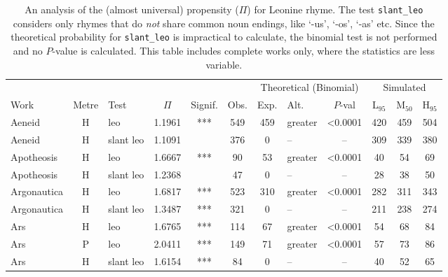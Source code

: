 \documentclass[twocolumn, switch, a4paper]{article} %
\begin{document}
\begin{table}[h!]
\caption{
An analysis of the (almost universal) propensity ($\Pi$) for Leonine rhyme.
The test \texttt{slant\_leo} considers only rhymes that do \emph{not} share
common noun endings, like `-us', `-os', `-as' etc. Since the theoretical
probability for \texttt{slant\_leo} is impractical to calculate, the binomial
test is not performed and no $P$-value is calculated. This table includes
complete works only, where the statistics are less variable.
}
\label{tab:leo}
\par\medskip
\centering
\begin{adjustbox}{totalheight=0.9\textheight}
  \begin{tabular}{lclcccclcc@{\hspace{1\tabcolsep}}c@{\hspace{1\tabcolsep}}c}
  \toprule
          &&&&&&\multicolumn{3}{c}{Theoretical (Binomial)}&\multicolumn{3}{c}{Simulated}\\\cmidrule(lr{2pt}){7-9}\cmidrule(l{2pt}r){10-12}
         Work & Metre &       Test &    $\Pi$ & Signif. &    Obs. &  Exp. & Alt. &  $P$-val & L$_{95}$ &  M$_{50}$ &  H$_{95}$ \\
  \midrule
        Aeneid &     H &        leo & 1.1961 &   *** &  549 &       459 &     greater & <0.0001 &  420 &  459 &  504 \\
        Aeneid &     H &  slant leo & 1.1091 &       &  376 &         0 &        -- & -- &  309 &  339 &  380 \\
    Apotheosis &     H &        leo & 1.6667 &   *** &   90 &        53 &     greater & <0.0001 &   40 &   54 &   69 \\
    Apotheosis &     H &  slant leo & 1.2368 &       &   47 &         0 &        -- & -- &   28 &   38 &   50 \\
   Argonautica &     H &        leo & 1.6817 &   *** &  523 &       310 &     greater & <0.0001 &  282 &  311 &  343 \\
   Argonautica &     H &  slant leo & 1.3487 &   *** &  321 &         0 &        -- & -- &  211 &  238 &  274 \\
           Ars &     H &        leo & 1.6765 &   *** &  114 &        67 &     greater & <0.0001 &   54 &   68 &   84 \\
           Ars &     P &        leo & 2.0411 &   *** &  149 &        71 &     greater & <0.0001 &   57 &   73 &   86 \\
           Ars &     H &  slant leo & 1.6154 &   *** &   84 &         0 &        -- & -- &   40 &   52 &   65 \\

\end{tabular}
\end{adjustbox}
\end{table}
\end{document}
